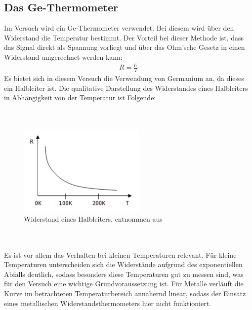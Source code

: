 \documentclass[german,  %
parskip=full,  %
]{scrartcl}
\begin{document}
\subsection{Das Ge-Thermometer}
Im Versuch wird ein Ge-Thermometer verwendet. Bei diesem wird über den Widerstand die Temperatur bestimmt. Der Vorteil bei dieser Methode ist, dass das Signal direkt als Spannung vorliegt und über das Ohm'sche Gesetz in einen Widerstand umgerechnet werden kann:
\begin{align}
R = \frac{U}{I}
\end{align} 
Es bietet sich in diesem Versuch die Verwendung von Germanium an, da dieses ein Halbleiter ist. Die qualitative Darstellung des Widerstandes eines Halbleiters in Abhängigkeit von der Temperatur ist Folgende:
\\\\\\
\begin{figure}[h!]
\centering
\includegraphics[width=0.55\textwidth]{res_sc}
\caption{Widerstand eines Halbleiters, entnommen aus \cite{4}}
\end{figure}
\\\\
Es ist vor allem das Verhalten bei kleinen Temperaturen relevant. Für kleine Temperaturen unterscheiden sich die Widerstände aufgrund des exponentiellen Abfalls deutlich, sodass besonders diese Temperaturen gut zu messen sind, was für den Versuch eine wichtige Grundvoraussetzung ist. Für Metalle verläuft die Kurve im betrachteten Temperaturbereich annähernd linear, sodass der Einsatz eines metallischen Widerstandsthermometers hier nicht funktioniert.

\newpage
\end{document}
